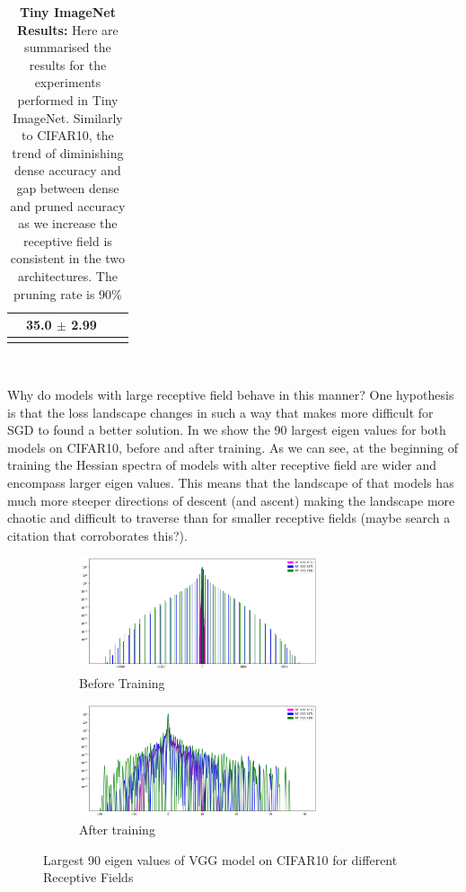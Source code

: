 \begin{table}[H]
\begin{tabular}{crrr}
                                             & 35.0 $\pm$ 2.99                                     \\ \hline\\
\end{tabular}\\
\caption{ \textbf{Tiny ImageNet Results:} Here are summarised the results for the experiments performed in Tiny ImageNet.
Similarly to CIFAR10, the trend of diminishing dense accuracy and gap between dense and pruned accuracy as we increase
the receptive field is consistent in the two architectures.
The pruning rate is 90\% }
\label{tab:tiny_imagenet_results}
\end{table}
Why do models with large receptive field behave in this manner? One hypothesis is that the loss landscape changes in
such a way that makes more difficult for SGD to found a better solution. In  we show the 90 largest eigen values for both models on CIFAR10, before and after training. As
we can see, at the beginning of training the Hessian spectra of models with alter receptive field are wider and
encompass larger eigen values. This means that the landscape of that models has much more steeper directions of descent
(and ascent) making the landscape more chaotic  and difficult to traverse than for smaller receptive fields (maybe search
a citation that corroborates this?).
\begin{figure}[h]
 \centering
     \begin{subfigure}[b]{0.45\textwidth}
    \includegraphics[width=7cm]{images/Hessian_spectre_vgg19_init_cifar10.png}
    \caption{Before Training}
    \label{subfig:Hessian_VGG_before_training}
     \end{subfigure}
      \hfill
     \begin{subfigure}[b]{0.45\textwidth}
    \includegraphics[width=7cm]{images/Hessian_spectre_vgg19_trained_cifar10.png}
    \caption{After training}
    \label{subfig:Hessian_VGG_after_training}
     \end{subfigure}
     \caption{Largest 90 eigen values of VGG model on CIFAR10 for different Receptive Fields  }
    \label{fig:hessian_vgg_cifar10}
\end{figure}

